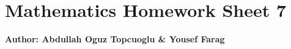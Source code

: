 \documentclass{article}
\begin{document}
\section*{\huge Mathematics Homework Sheet 7}
\begin{flushright}
   \textbf{Author: Abdullah Oguz Topcuoglu \& Yousef Farag}
\end{flushright}
\end{document}
